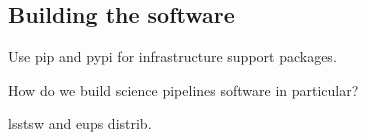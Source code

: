 \subsection{Building the software}

Use pip and pypi for infrastructure support packages.

How do we build science pipelines software in particular?

lsstsw and eups distrib.
